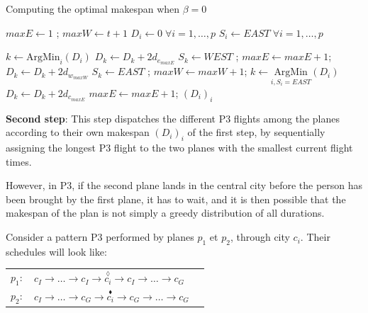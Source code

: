\documentclass{llncs}
\begin{document}
\begin{algorithm}[tb]
\caption{\label{subproblem} Computing the optimal makespan when $\beta = 0$}
\begin{algorithmic}\label{greedyAlgo}
\STATE $maxE \leftarrow 1$ ; $maxW \leftarrow t+1$ \hfill {}
\STATE $D_i \leftarrow 0 \; \forall i=1,\ldots,p$ \hfill{}
\STATE $S_i \leftarrow EAST \; \forall i=1,\ldots,p$ \hfill
{}

\STATE $k \leftarrow {\mbox{ArgMin}_i}(D_i)$ \hfill {}
\STATE $D_k \leftarrow D_k + 2d_{e_{maxE}}$\hfill
\STATE $S_k \leftarrow WEST$ ; $maxE \leftarrow maxE + 1 $;
\ELSE
\STATE $D_k \leftarrow D_k + 2d_{w_{maxW}}$ \hfill
\STATE $S_k \leftarrow EAST$ ; $maxW \leftarrow maxW + 1 $; 
\ENDIF
\ENDWHILE
\STATE $k \leftarrow \underset{i, S_i=EAST}{\mbox{ArgMin}}(D_i)$
\STATE $D_k \leftarrow D_k + 2d_{c_{maxE}}$ \hfill
\STATE $maxE \leftarrow maxE + 1 $; 
\ENDWHILE
\RETURN $(D_i)_i$ \hfill {}
\end{algorithmic}
\end{algorithm}

\noindent
{\bf Second step}: This step dispatches the different P3 flights among the planes according to their own makespan $(D_i)_i$ of the first step, by sequentially assigning the longest P3 flight to the two planes with the smallest current flight times.


However, in P3, if the second plane lands in the central city before the person has been brought by the first plane, it has to wait, and it is then possible that the makespan of the plan is not simply a greedy distribution of all durations.



Consider a pattern P3 performed by planes $p_1$ et $p_2$, through city $c_i$.  Their schedules will look like:

\begin{center}
\begin{tabular}{c l l}
    $p_1:$ & $c_I \to \ldots \to c_I \to \overset{\lozenge}{c_i} \to c_I \to \ldots \to c_G$\tabularnewline
    $p_2:$ & $c_I \to \ldots \to c_G \to \overset{\blacklozenge}{c_i} \to c_G \to \ldots \to c_G$\tabularnewline
\end{tabular}
\end{center}
\end{document}
